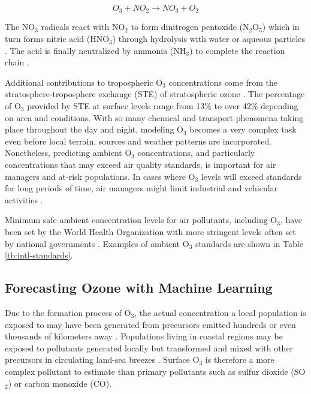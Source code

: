 \documentclass[preprint,12pt,authoryear]{elsarticle}
\begin{document}
\begin{linenumbers}
\begin{equation}
\label{eq:nitrateformation}
O_{3} + NO_{2}\rightarrow NO_{3}+O_{2} 
\end{equation}

The NO$_{3}$ radicals react with NO$_{2}$ to form dinitrogen pentoxide (N$_{2}$O$_{5}$) which in turn forms nitric acid (HNO$_{3}$) through hydrolysis with water or aqueous particles \citep{Song2011}. The acid is finally neutralized by ammonia (NH$_{3}$) to complete the reaction chain \citep{Brown2012}.

Additional contributions to tropospheric O$_{3}$ concentrations come from the stratosphere-troposphere exchange (STE) of stratospheric ozone \citep{Tarasick2008}. The percentage of O$_{3}$ provided by STE at surface levels range from 13\% \citep{Cooper2006} to over 42\% \citep{Lelieveld2000} depending on area and conditions. With so many chemical and transport phenomena taking place throughout the day and night, modeling O$_{3}$ becomes a very complex task even before local terrain, sources and weather patterns are incorporated. Nonetheless, predicting ambient O$_{3}$ concentrations, and particularly concentrations that may exceed air quality standards, is important for air managers and at-risk populations.  In cases where O$_{3}$ levels will exceed standards for long periods of time, air managers might limit industrial and vehicular activities \citep{Kuhlbusch2014, Welch2005}. 

Minimum safe ambient concentration levels for air pollutants, including O$_{3}$, have been set by the World Health Organization \citep{WHO2006} with more stringent levels often set by national governments \citep{USEPA2016}. Examples of ambient O$_{3}$ standards are shown in Table \ref{tb:intl-standards}.\\

	

\subsection{Forecasting Ozone with Machine Learning}

Due to the formation process of O$_{3}$, the actual concentration a local population is exposed to may have been generated from precursors emitted hundreds or even thousands of kilometers away \citep{Glavas2011}. Populations living in coastal regions may be exposed to pollutants generated locally but transformed and mixed with other precursors in circulating land-sea breezes \citep{Freeman2016a}. Surface O$_{3}$ is therefore a more complex pollutant to estimate than primary pollutants such as sulfur dioxide (SO$_{2}$) or carbon monoxide (CO).


\end{linenumbers}
\end{document}
